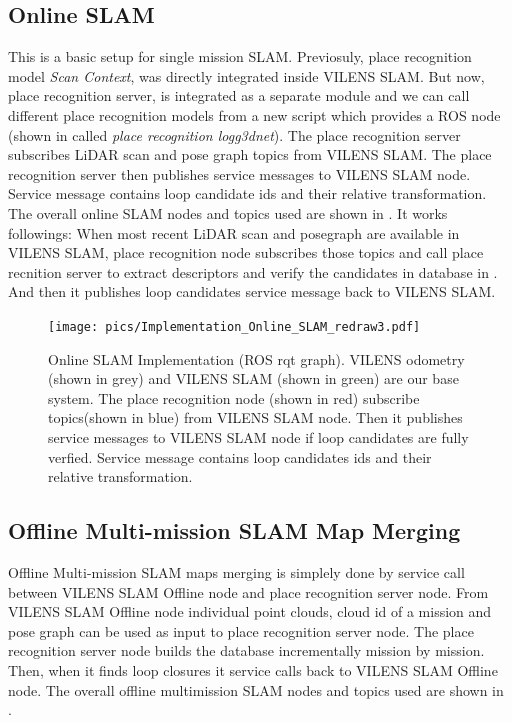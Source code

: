 \subsection{Online SLAM}
This is a basic setup for single mission SLAM. Previosuly, place recognition model \emph{Scan Context}, was directly integrated inside VILENS SLAM. But now, place recognition server, is integrated as a separate module and we can call different place recognition models from a new script which provides a ROS node (shown in  called \emph{place recognition logg3dnet}). The place recognition server subscribes LiDAR scan and pose graph topics from VILENS SLAM. The place recognition server then publishes service messages to VILENS SLAM node. Service message contains loop candidate ids and their relative transformation. The overall online SLAM nodes and topics used are shown in . 
It works followings: When most recent LiDAR scan and posegraph are available in VILENS SLAM, place recognition node subscribes those topics and call place recnition server to extract descriptors and verify the candidates in database in . And then it publishes loop candidates service message back to VILENS SLAM. 

\begin{figure}[t]
  \centering
  \texttt{[image: pics/Implementation\_Online\_SLAM\_redraw3.pdf]}
  \caption{Online SLAM Implementation (ROS rqt graph). VILENS odometry (shown in grey) and VILENS SLAM (shown in green) are our base system. The place recognition node (shown in red) subscribe topics(shown in blue) from VILENS SLAM node. Then it publishes service messages to VILENS SLAM node if loop candidates are fully verfied. Service message contains loop candidates ids and their relative transformation.}
  \label{fig:implementation_online_slam}
\end{figure}


\subsection{Offline Multi-mission SLAM Map Merging}
Offline Multi-mission SLAM maps merging is simplely done by  service call between VILENS SLAM Offline node and place recognition server node. From VILENS SLAM Offline node individual point clouds, cloud id of a mission and pose graph can be used as input to place recognition server node. The place recognition server node builds the database incrementally mission by mission. Then, when it finds loop closures it service calls back to VILENS SLAM Offline node. The overall offline multimission SLAM nodes and topics used are shown in .  

